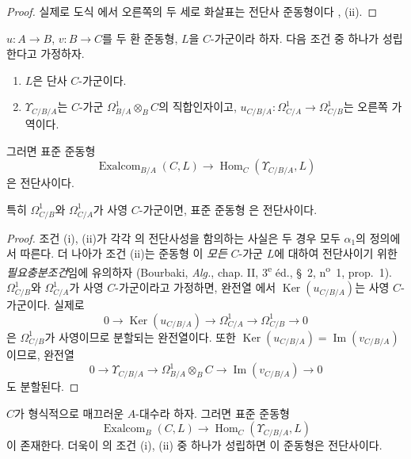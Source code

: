 \begin{proof}
실제로 도식 에서 오른쪽의 두 세로 화살표는
전단사 준동형이다 , (ii).
\end{proof}

\begin{theorem}[20.6.11]
\label{0.20.6.11-ko}
$u:A\to B$, $v:B\to C$를 두 환 준동형, $L$을 $C$-가군이라 하자.
다음 조건 중 하나가 성립한다고 가정하자.
\begin{enumerate}
  \item[\rm(i)] $L$은 단사 $C$-가군이다.
  \item[\rm(ii)] $\Upsilon_{C/B/A}$는 $C$-가군
$\Omega^1_{B/A}\otimes_B C$의 직합인자이고,
$u_{C/B/A}:\Omega^1_{C/A}\to\Omega^1_{C/B}$는 오른쪽 가역이다.
\end{enumerate}
그러면 표준 준동형 
\[
  \operatorname{Exalcom}_{B/A}(C,L)\longrightarrow
  \operatorname{Hom}_C(\Upsilon_{C/B/A},L)
\]
은 전단사이다.

특히 $\Omega^1_{C/B}$와 $\Omega^1_{C/A}$가 사영 $C$-가군이면,
표준 준동형 은 전단사이다.
\end{theorem}

\begin{proof}
조건 (i), (ii)가 각각 의 전단사성을 함의하는
사실은 두 경우 모두 $\alpha_1$의 정의에서 따른다. 더 나아가
조건 (ii)는 준동형 이 \emph{모든} $C$-가군
$L$에 대하여 전단사이기 위한 \emph{필요충분조건}임에 유의하자
(Bourbaki, \emph{Alg.}, chap. II, 3\textsuperscript{e} éd.,
\S~2, n\textsuperscript{o}~1, prop.~1).
$\Omega^1_{C/B}$와 $\Omega^1_{C/A}$가 사영 $C$-가군이라고 가정하면,
완전열 에서
$\operatorname{Ker}(u_{C/B/A})$는 사영 $C$-가군이다. 실제로
\[
  0\longrightarrow\operatorname{Ker}(u_{C/B/A})
  \longrightarrow\Omega^1_{C/A}
  \longrightarrow\Omega^1_{C/B}\longrightarrow0
\]
은 $\Omega^1_{C/B}$가 사영이므로 분할되는 완전열이다. 또한
$\operatorname{Ker}(u_{C/B/A})=\operatorname{Im}(v_{C/B/A})$이므로,
완전열
\[
  0\longrightarrow\Upsilon_{C/B/A}\longrightarrow
  \Omega^1_{B/A}\otimes_B C\longrightarrow
  \operatorname{Im}(v_{C/B/A})\longrightarrow0
\]
도 분할된다.
\end{proof}

\begin{corollary}[20.6.12]
\label{0.20.6.12-ko}
$C$가 형식적으로 매끄러운 $A$-대수라 하자. 그러면 표준 준동형
\begin{equation}
\tag{20.6.12.1}
\label{0.20.6.12.1-ko}
  \operatorname{Exalcom}_B(C,L)\longrightarrow
  \operatorname{Hom}_C(\Upsilon_{C/B/A},L)
\end{equation}
이 존재한다. 더욱이 의 조건 (i), (ii) 중
하나가 성립하면 이 준동형은 전단사이다.
\end{corollary}

